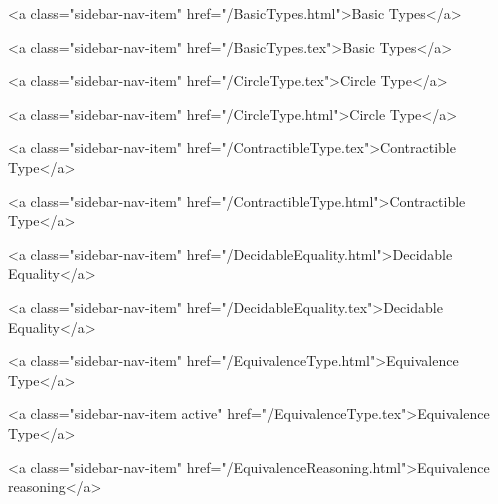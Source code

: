       
    
      
        
          <a class="sidebar-nav-item" href="/BasicTypes.html">Basic Types</a>
        
      
    
      
        
          <a class="sidebar-nav-item" href="/BasicTypes.tex">Basic Types</a>
        
      
    
      
        
          <a class="sidebar-nav-item" href="/CircleType.tex">Circle Type</a>
        
      
    
      
        
          <a class="sidebar-nav-item" href="/CircleType.html">Circle Type</a>
        
      
    
      
        
          <a class="sidebar-nav-item" href="/ContractibleType.tex">Contractible Type</a>
        
      
    
      
        
          <a class="sidebar-nav-item" href="/ContractibleType.html">Contractible Type</a>
        
      
    
      
        
          <a class="sidebar-nav-item" href="/DecidableEquality.html">Decidable Equality</a>
        
      
    
      
        
          <a class="sidebar-nav-item" href="/DecidableEquality.tex">Decidable Equality</a>
        
      
    
      
        
          <a class="sidebar-nav-item" href="/EquivalenceType.html">Equivalence Type</a>
        
      
    
      
        
          <a class="sidebar-nav-item active" href="/EquivalenceType.tex">Equivalence Type</a>
        
      
    
      
        
          <a class="sidebar-nav-item" href="/EquivalenceReasoning.html">Equivalence reasoning</a>
        
